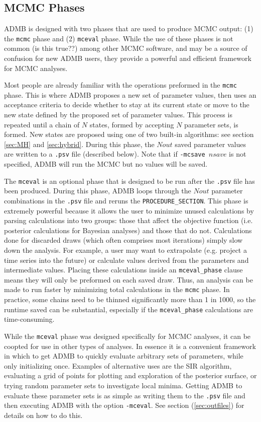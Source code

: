 \documentclass{article}\usepackage[]{graphicx}\usepackage[]{color}
\begin{document}
\subsection{MCMC Phases}
ADMB is designed with two phases that are used to produce
MCMC output: (1) the \texttt{mcmc} phase and (2)
\texttt{mceval} phase. While the use of these phases is not
common (is this true??) among other MCMC software, and may
be a source of confusion for new ADMB users, they provide a
powerful and efficient framework for MCMC analyses.

Most people are already familiar with the operations preformed 
in the \texttt{mcmc} phase. This is where ADMB proposes a new 
set of parameter values, then uses an acceptance criteria to
decide whether to stay at its current state or move to the new
state defined by the proposed set of parameter values. This
process is repeated until a chain of $N$ states, formed by 
accepting $N$ parameter sets, is formed. New states are 
proposed using one of two built-in algorithms: see section \ref{sec:MH} 
and \ref{sec:hybrid}. During this phase, the $Nout$ saved
parameter values are written to a \texttt{.psv} file
(described below). Note that if \texttt{-mcsave $nsave$} is
not specified, ADMB will run the MCMC but no values will be
saved.

The \texttt{mceval} is an optional phase that is designed to
be run after the \texttt{.psv} file has been
produced. During this phase, ADMB loops through the $Nout$
parameter combinations in the \texttt{.psv} file and reruns
the \texttt{PROCEDURE\_SECTION}. This phase is extremely powerful 
because it allows the user to minimize unused calculations by 
parsing calculations into two groups: those that affect the
objective function (i.e. posterior calculations for Bayesian
analyses) and those that do not. Calculations done for
discarded draws (which often comprises most iterations) simply 
slow down the analysis. For example, a user may want to extrapolate
(e.g. project a time series into the future) or calculate
values derived from the parameters and intermediate
values. Placing these calculations inside an
\texttt{mceval\_phase} clause means they will only be preformed 
on each saved draw. Thus, an analysis can be made to run
faster by minimizing total calculations in the \texttt{mcmc}
phase. In practice, some chains need to be thinned significantly 
more than 1 in 1000, so the runtime saved can be substantial, 
especially if the \texttt{mceval\_phase} calculations are 
time-consuming.

While the \texttt{mceval} phase was designed specifically
for MCMC analyses, it can be coopted for use in other types
of analyses. In essence it is a convenient framework in
which to get ADMB to quickly evaluate arbitrary sets of
parameters, while only initializing once. Examples of
alternative uses are the SIR algorithm,
evaluating a grid of points for plotting and exploration of
the posterior surface, or trying random parameter sets to
investigate local minima. Getting ADMB to evaluate these
parameter sets is as simple as writing them to the
\texttt{.psv} file and then executing ADMB with the option
\texttt{-mceval}. See section (\ref{sec:outfiles}) for
details on how to do this.
\end{document}
